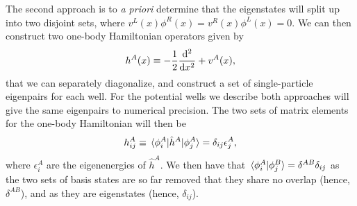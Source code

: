 \documentclass[twocolumn,superscriptaddress,unsortedaddress,
 amsmath,amssymb,
 aps,
]{revtex4-2}
\begin{document}
        The second approach is to \emph{a priori} determine that the
        eigenstates will split up into two disjoint sets, where
        $v^{L}(x) \phi^{R}(x) = v^{R}(x) \phi^{L}(x) = 0$.
        We can then construct two one-body Hamiltonian operators given
        by
        \begin{align*}
            h^{A}(x) \equiv -\frac{1}{2} \dv[2]{}{x} + v^{A}(x),
        \end{align*}
        that we can separately diagonalize, and construct a set of
        single-particle eigenpairs for each well.
        For the potential wells we describe both approaches will give the
        same eigenpairs to numerical precision.
        The two sets of matrix elements for the one-body Hamiltonian will
        then be
        \begin{align*}
            h^{A}_{ij}
            \equiv \mel*{\phi^A_i}{\hat{h}^A}{\phi^A_j}
            = \delta_{ij} \epsilon^{A}_j,
        \end{align*}
        where $\epsilon^A_i$ are the eigenenergies of $\hat{h}^A$.
        We then have that $\braket*{\phi^A_i}{\phi^B_j} = \delta^{AB}
        \delta_{ij}$ as the two sets of basis states are so far removed
        that they share no overlap (hence, $\delta^{AB}$), and as they
        are eigenstates (hence, $\delta_{ij}$).
\end{document}
